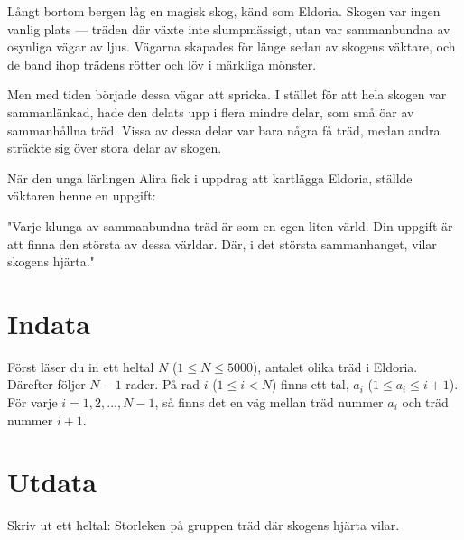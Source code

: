 Långt bortom bergen låg en magisk skog, känd som Eldoria. Skogen var ingen vanlig plats — träden där växte inte slumpmässigt, utan var sammanbundna av osynliga vägar av ljus. Vägarna skapades för länge sedan av skogens väktare, och de band ihop trädens rötter och löv i märkliga mönster.

Men med tiden började dessa vägar att spricka. I stället för att hela skogen var sammanlänkad, hade den delats upp i flera mindre delar, som små öar av sammanhållna träd. Vissa av dessa delar var bara några få träd, medan andra sträckte sig över stora delar av skogen.

När den unga lärlingen Alira fick i uppdrag att kartlägga Eldoria, ställde väktaren henne en uppgift:

"Varje klunga av sammanbundna träd är som en egen liten värld. Din uppgift är att finna den största av dessa världar. Där, i det största sammanhanget, vilar skogens hjärta."

\section*{Indata}
Först läser du in ett heltal $N$ ($1 \leq N \leq 5000$), antalet olika träd i Eldoria.
Därefter följer $N - 1$ rader. På rad $i$ ($1 \leq i < N$) finns ett tal, $a_i$ ($1 \leq a_i \leq i + 1$). För varje $i = 1, 2, ..., N - 1$, så finns det en väg mellan träd nummer $a_i$ och träd nummer $i + 1$.

\section*{Utdata}
Skriv ut ett heltal: Storleken på gruppen träd där skogens hjärta vilar.